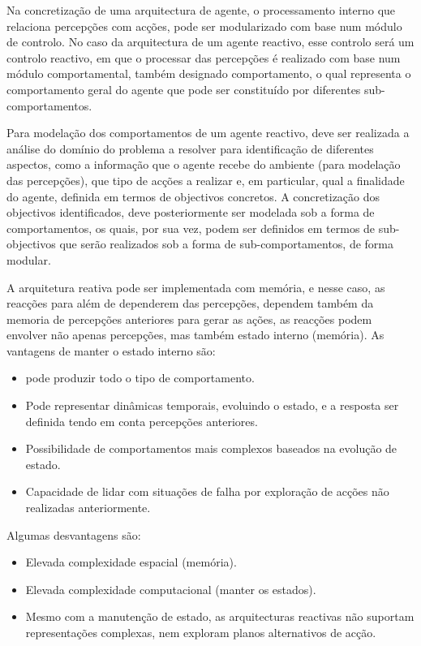 \documentclass[a4paper,12pt]{article}
\begin{document}
Na concretização de uma arquitectura de agente, o processamento interno que relaciona percepções com acções, pode ser modularizado com base num módulo de controlo.
No caso da arquitectura de um agente reactivo, esse controlo será um controlo reactivo, em que o processar das percepções é realizado com base num módulo comportamental, também designado comportamento, o qual representa o comportamento geral do agente que pode ser constituído por diferentes sub-comportamentos.

Para modelação dos comportamentos de um agente reactivo, deve ser realizada a análise do domínio do problema a resolver para identificação de diferentes aspectos, como a informação que o agente recebe do ambiente (para modelação das percepções), que tipo de acções a realizar e, em particular, qual a finalidade do agente, definida em termos de objectivos concretos.
A concretização dos objectivos identificados, deve posteriormente ser modelada sob a forma de comportamentos, os quais, por sua vez, podem ser definidos em termos de sub-objectivos que serão realizados sob a forma de sub-comportamentos, de forma modular.

A arquitetura reativa pode ser implementada com memória, e nesse caso, as reacções para além de dependerem das percepções, dependem também da memoria de percepções anteriores para gerar as ações, as reacções podem envolver não apenas percepções, mas também estado interno (memória). As vantagens de manter o estado interno são:
\begin{itemize}
	\item pode produzir todo o tipo de comportamento.
	\item Pode representar dinâmicas temporais, evoluindo o estado, e a resposta ser definida tendo em conta percepções anteriores.
	\item Possibilidade de comportamentos mais complexos baseados na evolução de estado.
	\item Capacidade de lidar com situações de falha por exploração de acções não realizadas anteriormente.
\end{itemize}

Algumas desvantagens são:
\begin{itemize}
	\item Elevada complexidade espacial (memória).
	\item Elevada complexidade computacional (manter os estados).
	\item Mesmo com a manutenção de estado, as arquitecturas reactivas não suportam representações complexas, nem exploram planos alternativos de acção.
\end{itemize}
\end{document}
